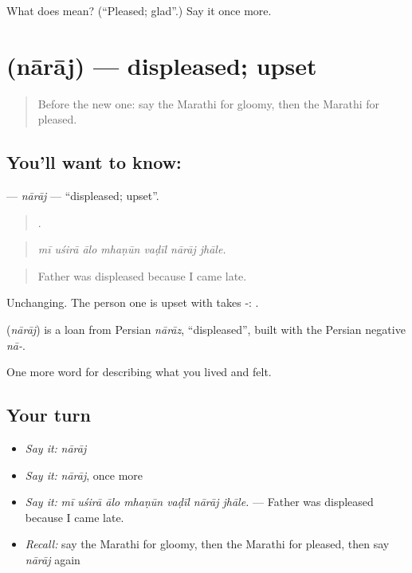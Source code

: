 \begin{tcolorbox}[breakable,colback=teal!4,colframe=teal!35!black,title={Before you move on}]
What does  mean? (\textquotedblleft{}Pleased; glad\textquotedblright{}.) Say it once more.
\end{tcolorbox}
\section[\texorpdfstring{\mr{नाराज} (nārāj)}{नाराज (nārāj)}]{ (nārāj) — displeased; upset}

\label{lesson:MR-C451-naraj}



\begin{quote}
Before the new one: say the Marathi for gloomy, then the Marathi for pleased.
\end{quote}

\subsection*{You'll want to know: }
\textbf{} — \emph{nārāj} — \textquotedblleft{}displeased; upset\textquotedblright{}.

\begin{quote}
      .
\end{quote}

\begin{quote}
\emph{mī uśirā ālo mhaṇūn vaḍīl nārāj jhāle.}
\end{quote}

\begin{quote}
Father was displeased because I came late.
\end{quote}

Unchanging. The person one is upset with takes -:    .

\begin{cousinweb}
\textbf{} (\emph{nārāj}) is a loan from Persian \emph{nārāz}, \textquotedblleft{}displeased\textquotedblright{}, built with the Persian negative \emph{nā-}.
\end{cousinweb}

\begin{grammarlens}[title={What you've built}]
One more word for describing what you lived and felt.
\end{grammarlens}

\subsection*{Your turn}
\begin{itemize}
\raggedright
  \item \emph{Say it:} \emph{nārāj}
  \item \emph{Say it:} \emph{nārāj}, once more
  \item \emph{Say it:} \emph{mī uśirā ālo mhaṇūn vaḍīl nārāj jhāle.} — Father was displeased because I came late.
  \item \emph{Recall:} say the Marathi for gloomy, then the Marathi for pleased, then say \emph{nārāj} again
\end{itemize}

